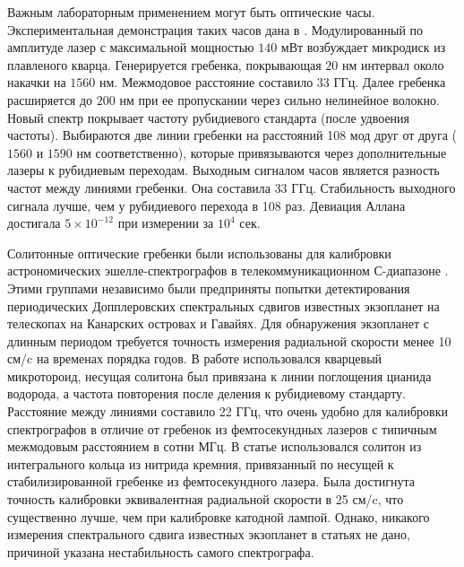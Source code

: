Важным лабораторным применением могут быть оптические часы. Экспериментальная демонстрация таких часов дана в \cite{Papp2014}. Модулированный по амплитуде лазер с максимальной мощностью $140$ мВт возбуждает микродиск из плавленого кварца. Генерируется гребенка, покрывающая $20$ нм интервал около накачки на $1560$ нм. Межмодовое расстояние составило $33$ ГГц. Далее гребенка расширяется до $200$ нм при ее пропускании через сильно нелинейное волокно. Новый спектр покрывает частоту рубидиевого стандарта (после удвоения частоты). Выбираются две линии гребенки на расстояний 108 мод друг от друга ($1560$ и $1590$ нм соответственно), которые привязываются через дополнительные лазеры к рубидиевым переходам. Выходным сигналом часов является разность частот между линиями гребенки. Она составила $33$ ГГц. Стабильность выходного сигнала лучше, чем у рубидиевого перехода в 108 раз. Девиация Аллана достигала $5\times10^{-12}$ при измерении за $10^4$ сек.

Солитонные оптические гребенки были использованы для калибровки астрономических эшелле-спектрографов в телекоммуникационном С-диапазоне \cite{Obrzud2019,Suh2019}. Этими группами независимо были предприняты попытки детектирования периодических Допплеровских спектральных сдвигов известных экзопланет на телескопах на Канарских островах и Гавайях. Для обнаружения экзопланет с длинным периодом требуется точность измерения радиальной скорости менее 10 см/c на временах порядка годов. В работе \cite{Suh2019} использовался кварцевый микротороид, несущая солитона был привязана к линии поглощения цианида водорода, а частота повторения после деления к рубидиевому стандарту. Расстояние между линиями составило 22 ГГц, что очень удобно для калибровки спектрографов в отличие от гребенок из фемтосекундных лазеров с типичным межмодовым расстоянием в сотни МГц. В статье \cite{Obrzud2019} использовался солитон из интегрального кольца из нитрида кремния, привязанный по несущей к стабилизированной гребенке из фемтосекундного лазера. Была достигнута точность калибровки эквивалентная радиальной скорости в 25 см/c, что существенно лучше, чем при калибровке катодной лампой. Однако, никакого измерения спектрального сдвига известных экзопланет в статьях не дано, причиной указана нестабильность самого спектрографа.

